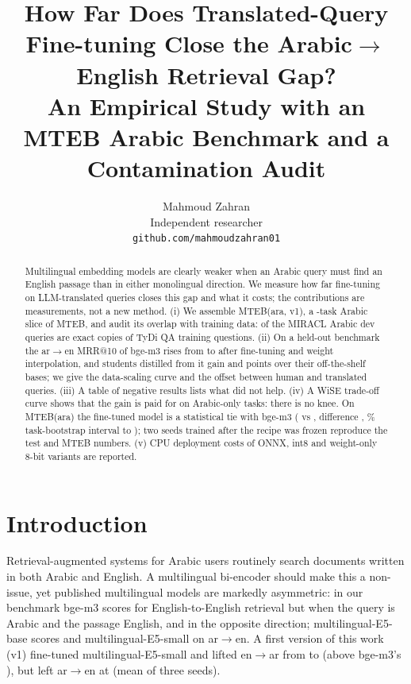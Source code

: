 \documentclass[11pt]{article}
\title{How Far Does Translated-Query Fine-tuning Close the Arabic$\to$English Retrieval Gap?\\
An Empirical Study with an MTEB Arabic Benchmark and a Contamination Audit}
\author{Mahmoud Zahran \\
  Independent researcher \\
  \texttt{github.com/mahmoudzahran01}}
\newcommand{\ardir}{ar$\to$en}
\newcommand{\eadir}{en$\to$ar}
\begin{document}
\maketitle

\begin{abstract}
Multilingual embedding models are clearly weaker when an Arabic query must find an English passage than in either monolingual direction.
We measure how far fine-tuning on LLM-translated queries closes this gap and what it costs; the contributions are measurements, not a new method.
(i) We assemble MTEB(ara, v1), a \NumMtebTasks-task Arabic slice of MTEB, and audit its overlap with training data: \NumMiraclExact{} of the \NumMiraclQueries{} MIRACL Arabic dev queries are exact copies of TyDi QA training questions.
(ii) On a held-out benchmark the \ardir{} MRR@10 of bge-m3 rises from \NumBgeArEn{} to \NumVTwoMArEn{} after fine-tuning and weight interpolation, and students distilled from it gain \NumDeltaVTwoBVsEBaseArEn{} and \NumDeltaVTwoSVsESmallArEn{} points over their off-the-shelf bases; we give the data-scaling curve and the offset between human and translated queries.
(iii) A table of negative results lists what did not help.
(iv) A WiSE trade-off curve shows that the gain is paid for on Arabic-only tasks: there is no knee.
On MTEB(ara) the fine-tuned model is a statistical tie with bge-m3 (\NumPairedMNew{} vs \NumPairedMRef, difference \NumPairedMMeanDiff{}, \NumCiLevel\% task-bootstrap interval \NumPairedMCiLo{} to \NumPairedMCiHi{}); two seeds trained after the recipe was frozen reproduce the test and MTEB numbers.
(v) CPU deployment costs of ONNX, int8 and weight-only 8-bit variants are reported.
\end{abstract}

\section{Introduction}
Retrieval-augmented systems for Arabic users routinely search documents written in both Arabic and English.
A multilingual bi-encoder should make this a non-issue, yet published multilingual models are markedly asymmetric:
in our benchmark bge-m3 scores \NumBgeEnEn{} for English-to-English retrieval but \NumBgeArEn{} when the query is Arabic and the passage English, and \NumBgeEnAr{} in the opposite direction; multilingual-E5-base scores \NumEBaseArEn{} and multilingual-E5-small \NumESmallArEn{} on \ardir{}.
A first version of this work (v1) fine-tuned multilingual-E5-small and lifted \eadir{} from \NumESmallEnAr{} to \NumVOneEnAr{} (above bge-m3's \NumBgeEnAr), but left \ardir{} at \NumVOneSeedArEn{} (mean of three seeds).
\end{document}
